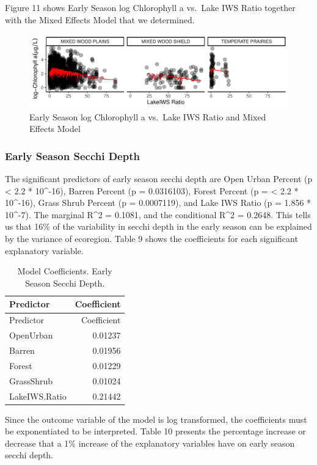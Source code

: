 \documentclass[12pt,]{article}
\begin{document}
Figure 11 shows Early Season log Chlorophyll a vs.~Lake IWS Ratio
together with the Mixed Effects Model that we determined.

\begin{figure}
\centering
\includegraphics{Bollt_Greif_Raby_Roth_Project_Final_files/figure-latex/unnamed-chunk-20-1.pdf}
\caption{Early Season log Chlorophyll a vs.~Lake IWS Ratio and Mixed
Effects Model}
\end{figure}

\hypertarget{early-season-secchi-depth}{%
\subsubsection{Early Season Secchi
Depth}\label{early-season-secchi-depth}}

The significant predictors of early season secchi depth are Open Urban
Percent (p \textless{} 2.2 * 10\^{}-16), Barren Percent (p = 0.0316103),
Forest Percent (p = \textless{} 2.2 * 10\^{}-16), Grass Shrub Percent (p
= 0.0007119), and Lake IWS Ratio (p = 1.856 * 10\^{}-7). The marginal
R\^{}2 = 0.1081, and the conditional R\^{}2 = 0.2648. This tells us that
16\% of the variability in secchi depth in the early season can be
explained by the variance of ecoregion. Table 9 shows the coefficients
for each significant explanatory variable.

\begin{longtable}[]{@{}lr@{}}
\caption{Model Coefficients. Early Season Secchi Depth.}\tabularnewline
\toprule
Predictor & Coefficient\tabularnewline
\midrule
\endfirsthead
\toprule
Predictor & Coefficient\tabularnewline
\midrule
\endhead
OpenUrban & 0.01237\tabularnewline
Barren & 0.01956\tabularnewline
Forest & 0.01229\tabularnewline
GrassShrub & 0.01024\tabularnewline
LakeIWS.Ratio & 0.21442\tabularnewline
\bottomrule
\end{longtable}

Since the outcome variable of the model is log transformed, the
coefficients must be exponentiated to be interpreted. Table 10 presents
the percentage increase or decrease that a 1\% increase of the
explanatory variables have on early season secchi depth.
\end{document}
